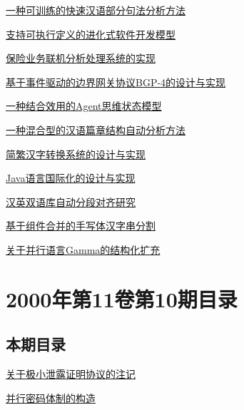 \documentclass[a4paper]{article}
\begin{document}
\href{http://www.jos.org.cn/ch/reader/download_pdf.aspx?file_no=20001111&year_id=2000&quarter_id=11&falg=1}{一种可训练的快速汉语部分句法分析方法}

\href{http://www.jos.org.cn/ch/reader/download_pdf.aspx?file_no=20001112&year_id=2000&quarter_id=11&falg=1}{支持可执行定义的进化式软件开发模型}

\href{http://www.jos.org.cn/ch/reader/download_pdf.aspx?file_no=20001113&year_id=2000&quarter_id=11&falg=1}{保险业务联机分析处理系统的实现}

\href{http://www.jos.org.cn/ch/reader/download_pdf.aspx?file_no=20001114&year_id=2000&quarter_id=11&falg=1}{基于事件驱动的边界网关协议BGP-4的设计与实现}

\href{http://www.jos.org.cn/ch/reader/download_pdf.aspx?file_no=20001115&year_id=2000&quarter_id=11&falg=1}{一种结合效用的Agent思维状态模型}

\href{http://www.jos.org.cn/ch/reader/download_pdf.aspx?file_no=20001116&year_id=2000&quarter_id=11&falg=1}{一种混合型的汉语篇章结构自动分析方法}

\href{http://www.jos.org.cn/ch/reader/download_pdf.aspx?file_no=20001117&year_id=2000&quarter_id=11&falg=1}{简繁汉字转换系统的设计与实现}

\href{http://www.jos.org.cn/ch/reader/download_pdf.aspx?file_no=20001118&year_id=2000&quarter_id=11&falg=1}{Java语言国际化的设计与实现}

\href{http://www.jos.org.cn/ch/reader/download_pdf.aspx?file_no=20001119&year_id=2000&quarter_id=11&falg=1}{汉英双语库自动分段对齐研究}

\href{http://www.jos.org.cn/ch/reader/download_pdf.aspx?file_no=20001120&year_id=2000&quarter_id=11&falg=1}{基于组件合并的手写体汉字串分割}

\href{http://www.jos.org.cn/ch/reader/download_pdf.aspx?file_no=20001121&year_id=2000&quarter_id=11&falg=1}{关于并行语言Gamma的结构化扩充}


\section{\textbf{2000年第11卷第10期目录}}
\subsection{本期目录}
\href{http://www.jos.org.cn/ch/reader/download_pdf.aspx?file_no=20001001&year_id=2000&quarter_id=10&falg=1}{关于极小泄露证明协议的注记}

\href{http://www.jos.org.cn/ch/reader/download_pdf.aspx?file_no=20001002&year_id=2000&quarter_id=10&falg=1}{并行密码体制的构造}
\end{document}
